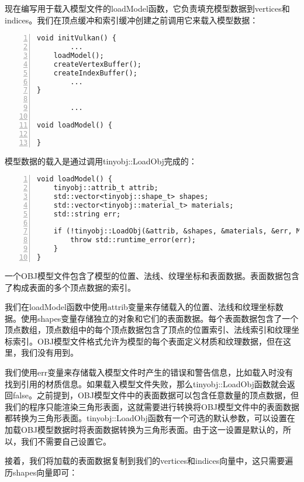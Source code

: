 \documentclass{ctexart}
\begin{document}
现在编写用于载入模型文件的loadModel函数，它负责填充模型数据到vertices和indices。我们在顶点缓冲和索引缓冲创建之前调用它来载入模型数据：

\begin{lstlisting}[language={[ANSI]C},keywordstyle=\color{blue!70},commentstyle=\color{red!50!green!50!blue!50},frame=shadowbox, rulesepcolor=\color{red!20!green!20!blue!20},basicstyle=\small,numbers=left, numberstyle=\tiny,breaklines=true]
void initVulkan() {
		...
	loadModel();
	createVertexBuffer();
	createIndexBuffer();
		...
}

		...

void loadModel() {

}
\end{lstlisting}

模型数据的载入是通过调用tinyobj::LoadObj完成的：

\begin{lstlisting}[language={[ANSI]C},keywordstyle=\color{blue!70},commentstyle=\color{red!50!green!50!blue!50},frame=shadowbox, rulesepcolor=\color{red!20!green!20!blue!20},basicstyle=\small,numbers=left, numberstyle=\tiny,breaklines=true]
void loadModel() {
	tinyobj::attrib_t attrib;
	std::vector<tinyobj::shape_t> shapes;
	std::vector<tinyobj::material_t> materials;
	std::string err;

	if (!tinyobj::LoadObj(&attrib, &shapes, &materials, &err, MODEL_PATH.c_str())) {
		throw std::runtime_error(err);
	}
}
\end{lstlisting}

一个OBJ模型文件包含了模型的位置、法线、纹理坐标和表面数据。表面数据包含了构成表面的多个顶点数据的索引。

我们在loadModel函数中使用attrib变量来存储载入的位置、法线和纹理坐标数据。使用shapes变量存储独立的对象和它们的表面数据。每个表面数据包含了一个顶点数组，顶点数组中的每个顶点数据包含了顶点的位置索引、法线索引和纹理坐标索引。OBJ模型文件格式允许为模型的每个表面定义材质和纹理数据，但在这里，我们没有用到。

我们使用err变量来存储载入模型文件时产生的错误和警告信息，比如载入时没有找到引用的材质信息。如果载入模型文件失败，那么tinyobj::LoadObj函数就会返回false。之前提到，OBJ模型文件中的表面数据可以包含任意数量的顶点数据，但我们的程序只能渲染三角形表面，这就需要进行转换将OBJ模型文件中的表面数据都转换为三角形表面。tinyobj::LoadObj函数有一个可选的默认参数，可以设置在加载OBJ模型数据时将表面数据转换为三角形表面。由于这一设置是默认的，所以，我们不需要自己设置它。

接着，我们将加载的表面数据复制到我们的vertices和indices向量中，这只需要遍历shapes向量即可：
\end{document}
